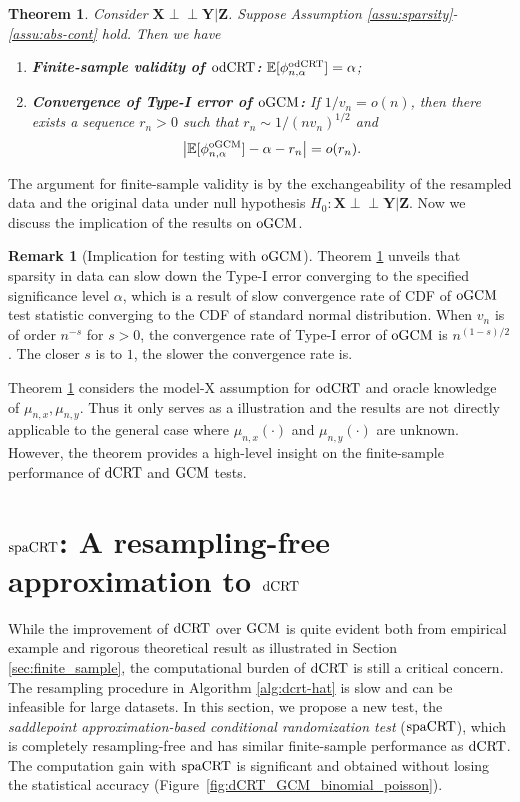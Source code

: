 \documentclass[12pt]{article}
\newtheorem{theorem}{Theorem}
\theoremstyle{definition}
\newtheorem{remark}{Remark}
\newcommand{\indep}{\perp \!\!\! \perp}
\newcommand{\E}{\mathbb E}								%
\newcommand{\prx}{\bm X}								%
\newcommand{\prz}{\bm Z}								%
\newcommand{\pry}{{\bm Y}}								%
\newcommand{\dCRT}{\textnormal{dCRT}} 					%
\newcommand{\odCRT}{\textnormal{odCRT}} 					%
\newcommand{\GCM}{\textnormal{GCM}}						%
\newcommand{\oGCM}{\textnormal{oGCM}}						%
\newcommand{\spacrt}{\textnormal{spaCRT}}               %
\begin{document}
\begin{theorem}\label{thm:illustrative}
  Consider $\prx\indep\pry|\prz$. Suppose Assumption \ref{assu:sparsity}-\ref{assu:abs-cont} hold. Then we have
  \begin{enumerate}
    \item \textbf{Finite-sample validity of $\odCRT$:} $\E[\phi_{n,\alpha}^{\odCRT}]=\alpha$;
    \item \textbf{Convergence of Type-I error of $\oGCM$:} If $1/v_n=o(n)$, then there exists a sequence $r_n>0$ such that $r_n\sim 1/(nv_n)^{1/2}$ and
    \begin{align}\label{eq:illustrative-convergence}
      \left|\E[\phi_{n,\alpha}^{\oGCM}]-\alpha-r_n\right|=o(r_n).
    \end{align}
  \end{enumerate}
\end{theorem}
The argument for finite-sample validity is by the exchangeability of the resampled data and the original data under null hypothesis $H_0:\prx\indep\pry|\prz$. Now we discuss the implication of the results on $\oGCM$.
\begin{remark}[Implication for testing with $\oGCM$]
	Theorem \ref{thm:illustrative} unveils that sparsity in data can slow down the Type-I error converging to the specified significance level $\alpha$, which is a result of slow convergence rate of CDF of $\oGCM$ test statistic converging to the CDF of standard normal distribution. When $v_n$ is of order $n^{-s}$ for $s>0$, the convergence rate of Type-I error of $\oGCM$ is $n^{(1-s)/2}$. The closer $s$ is to $1$, the slower the convergence rate is. 
\end{remark}

Theorem \ref{thm:illustrative} considers the model-X assumption for $\odCRT$ and oracle knowledge of $\mu_{n,x},\mu_{n,y}$. Thus it only serves as a illustration and the results are not directly applicable to the general case where $\mu_{n,x}(\cdot)$ and $\mu_{n,y}(\cdot)$ are unknown. However, the theorem provides a high-level insight on the finite-sample performance of $\dCRT$ and $\GCM$ tests. 

\section{$\spacrt$: A resampling-free approximation to $\dCRT$} \label{sec:spacrt}


While the improvement of $\dCRT$ over $\GCM$ is quite evident both from empirical example and rigorous theoretical result as illustrated in Section \ref{sec:finite_sample}, the computational burden of $\dCRT$ is still a critical concern. The resampling procedure in Algorithm \ref{alg:dcrt-hat} is slow and can be infeasible for large datasets. In this section, we propose a new test, the \textit{saddlepoint approximation-based conditional randomization test} ($\spacrt$), which is completely resampling-free and has similar finite-sample performance as $\dCRT$. The computation gain with $\spacrt$ is significant and obtained without losing the statistical accuracy (Figure~\ref{fig:dCRT_GCM_binomial_poisson}).
\end{document}
